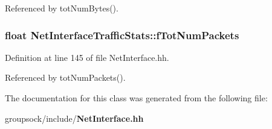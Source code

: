 Referenced by tot\+Num\+Bytes().

\subsubsection[{f\+Tot\+Num\+Packets}]{\setlength{\rightskip}{0pt plus 5cm}float Net\+Interface\+Traffic\+Stats\+::f\+Tot\+Num\+Packets\hspace{0.3cm}{\ttfamily [private]}}\label{classNetInterfaceTrafficStats_af9bde388817e30c5dc9643f04716f0db}


Definition at line 145 of file Net\+Interface.\+hh.



Referenced by tot\+Num\+Packets().



The documentation for this class was generated from the following file\+:\begin{DoxyCompactItemize}
\item 
groupsock/include/{\bf Net\+Interface.\+hh}\end{DoxyCompactItemize}
